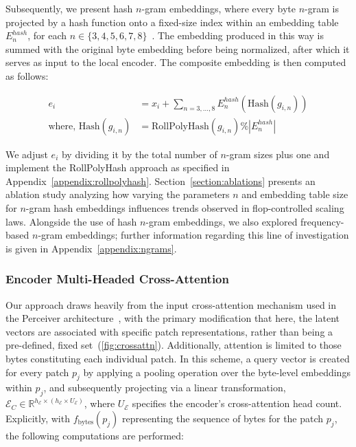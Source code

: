 Subsequently, we present hash $n$-gram embeddings, where every byte $n$-gram is projected by a hash function onto a fixed-size index within an embedding table $E_{n}^{hash}$, for each $n \in\{3,4,5,6,7,8\}$~\citep{bai2010learning}. The embedding produced in this way is summed with the original byte embedding before being normalized, after which it serves as input to the local encoder. The composite embedding is then computed as follows:

\begin{align}
e_i &= x_i + \sum_{n = 3,...,8}E_{n}^{hash}(\text{Hash}(g_{i,n})) \\
\text{where, Hash}(g_{i,n}) &= \text{RollPolyHash}(g_{i,n}) \% |E_{n}^{hash}|
\end{align}

We adjust $e_i$ by dividing it by the total number of $n$-gram sizes plus one and implement the RollPolyHash approach as specified in Appendix~\ref{appendix:rollpolyhash}. Section~\ref{section:ablations} presents an ablation study analyzing how varying the parameters $n$ and embedding table size for $n$-gram hash embeddings influences trends observed in flop-controlled scaling laws. Alongside the use of hash $n$-gram embeddings, we also explored frequency-based $n$-gram embeddings; further information regarding this line of investigation is given in Appendix~\ref{appendix:ngrams}.

\subsubsection{Encoder Multi-Headed Cross-Attention}
\label{sec:enc-cross-attn}
Our approach draws heavily from the input cross-attention mechanism used in the Perceiver architecture~\citep{jaegle2021perceiver}, with the primary modification that here, the latent vectors are associated with specific patch representations, rather than being a pre-defined, fixed set~(\autoref{fig:crossattn}). Additionally, attention is limited to those bytes constituting each individual patch. In this scheme, a query vector is created for every patch $p_j$ by applying a pooling operation over the byte-level embeddings within $p_j$, and subsequently projecting via a linear transformation, $\mathcal{E}_{C} \in \mathbb{R}^{h_{\mathcal{E}} \times (h_{\mathcal{E}} \times U_{\mathcal{E}})}$, where $U_{\mathcal{E}}$ specifies the encoder’s cross-attention head count. Explicitly, with $f_{\text{bytes}}(p_j)$ representing the sequence of bytes for the patch $p_j$, the following computations are performed:

